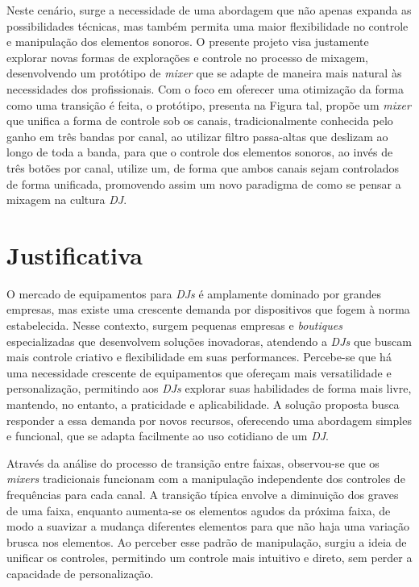 Neste cenário, surge a necessidade de uma abordagem que não apenas expanda as possibilidades técnicas, mas também permita uma maior flexibilidade no controle e manipulação dos elementos sonoros. O presente projeto visa justamente explorar novas formas de explorações e controle no processo de mixagem, desenvolvendo um protótipo de \textit{mixer} que se adapte de maneira mais natural às necessidades dos profissionais. Com o foco em oferecer uma otimização da forma como uma transição é feita, o protótipo, presenta na Figura tal, propõe um \textit{mixer} que unifica a forma de controle sob os canais, tradicionalmente conhecida pelo ganho em três bandas por canal, ao utilizar filtro passa-altas que deslizam ao longo de toda a banda, para que o controle dos elementos sonoros, ao invés de três botões por canal, utilize um, de forma que ambos canais sejam controlados de forma unificada, promovendo assim um novo paradigma de como se pensar a mixagem na cultura \textit{DJ}.

\section{Justificativa}
O mercado de equipamentos para \textit{DJs} é amplamente dominado por grandes empresas, mas existe uma crescente demanda por dispositivos que fogem à norma estabelecida. Nesse contexto, surgem pequenas empresas e \textit{boutiques} especializadas que desenvolvem soluções inovadoras, atendendo a \textit{DJs} que buscam mais controle criativo e flexibilidade em suas performances. Percebe-se que há uma necessidade crescente de equipamentos que ofereçam mais versatilidade e personalização, permitindo aos \textit{DJs} explorar suas habilidades de forma mais livre, mantendo, no entanto, a praticidade e aplicabilidade. A solução proposta busca responder a essa demanda por novos recursos, oferecendo uma abordagem simples e funcional, que se adapta facilmente ao uso cotidiano de um \textit{DJ}.

Através da análise do processo de transição entre faixas, observou-se que os \textit{mixers} tradicionais funcionam com a manipulação independente dos controles de frequências para cada canal. A transição típica envolve a diminuição dos graves de uma faixa, enquanto aumenta-se os elementos agudos da próxima faixa, de modo a suavizar a mudança diferentes elementos para que não haja uma variação brusca nos elementos. Ao perceber esse padrão de manipulação, surgiu a ideia de unificar os controles, permitindo um controle mais intuitivo e direto, sem perder a capacidade de personalização.

